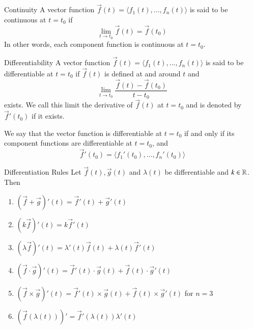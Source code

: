 \documentclass[12pt]{report}
\begin{document}
\begin{appendices}
    \begin{defn}{Continuity}{}
        A vector function $\vec{f}(t) = \langle f_1(t),...,f_n(t)\rangle$ is said to be continuous at $t = t_0$ if \begin{equation}
            \lim\limits_{t\rightarrow t_0}\vec{f}(t) = \vec{f}(t_0)
        \end{equation}
        In other words, each component function is continuous at $t = t_0$.
    \end{defn}

    \begin{defn}{Differentiability}{}
        A vector function $\vec{f}(t) = \langle f_1(t),...,f_n(t)\rangle$ is said to be differentiable at $t = t_0$ if $\vec{f}(t)$ is defined at and around $t$ and \begin{equation}
            \lim\limits_{t\rightarrow t_0}\frac{\vec{f}(t) - \vec{f}(t_0)}{t - t_0}
        \end{equation}
        exists. We call this limit the derivative of $\vec{f}(t)$ at $t = t_0$ and is denoted by $\vec{f}'(t_0)$ if it exists.
    \end{defn}

    \begin{thm}{}{}
        We say that the vector function is differentiable at $t = t_0$ if and only if its component functions are differentiable at $t = t_0$, and \begin{equation}
            \vec{f}'(t_0) = \langle f_1'(t_0),...,f_n'(t_0)\rangle
        \end{equation}
    \end{thm}



    \begin{rmk}{Differentiation Rules}{}
        Let $\vec{f}(t), \vec{g}(t)$ and $\lambda(t)$ be differentiable and $k \in \mathbb R$. Then \begin{enumerate}
            \item $(\vec{f}+\vec{g})'(t) = \vec{f}'(t) + \vec{g}'(t)$
            \item $(k\vec{f})'(t) = k\vec{f}'(t)$
            \item $(\lambda\vec{f})'(t) = \lambda'(t)\vec{f}(t) + \lambda(t)\vec{f}'(t)$
            \item $(\vec{f}\cdot\vec{g})'(t) = \vec{f}'(t)\cdot \vec{g}(t) + \vec{f}(t)\cdot \vec{g}'(t)$
            \item $(\vec{f}\times \vec{g})'(t) = \vec{f}'(t)\times \vec{g}(t) + \vec{f}(t)\times \vec{g}'(t)$ for $n = 3$
            \item $(\vec{f}(\lambda(t)))' = \vec{f}'(\lambda(t))\lambda'(t)$
        \end{enumerate}
    \end{rmk}



\end{appendices}
\end{document}
